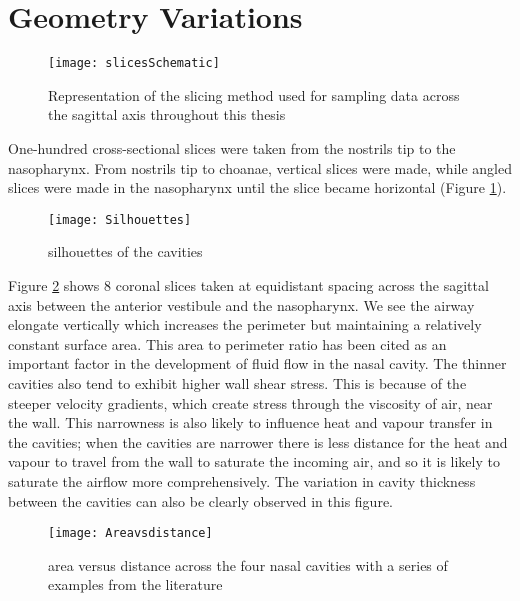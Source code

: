 \section{Geometry Variations}

\begin{figure} 
\centering
\texttt{[image: slicesSchematic]}
\caption{Representation of the slicing method used for sampling data across the sagittal axis throughout this thesis} 
\label{fig:Slices}
\end{figure}

One-hundred cross-sectional slices were taken from the nostrils tip to the nasopharynx. From nostrils tip to choanae, vertical slices were made, while angled slices were made in the nasopharynx until the slice became horizontal (Figure \ref{fig:Slices}).

\begin{figure} 
  \texttt{[image: Silhouettes]}
  \caption{silhouettes of the cavities}
  \label{fig:sil}

\end{figure}
Figure \ref{fig:sil} shows 8 coronal slices taken at equidistant spacing across the sagittal axis between the anterior vestibule and the nasopharynx. We see the airway elongate vertically which increases the perimeter but maintaining a relatively constant surface area. This area to perimeter ratio has been cited as an important factor in the development of fluid flow in the nasal cavity. The thinner cavities also tend to exhibit higher wall shear stress. This is because of the steeper velocity gradients, which create stress through the viscosity of air, near the wall. This narrowness is also likely to influence heat and vapour transfer in the cavities; when the cavities are narrower there is less distance for the heat and vapour to travel from the wall to saturate the incoming air, and so it is likely to saturate the airflow more comprehensively. The variation in cavity thickness between the cavities can also be clearly observed in this figure.

\begin{figure}
  \texttt{[image: Areavsdistance]}
  \caption{area versus distance across the four nasal cavities with a series of examples from the literature}
  \label{fig:area}
\end{figure}


